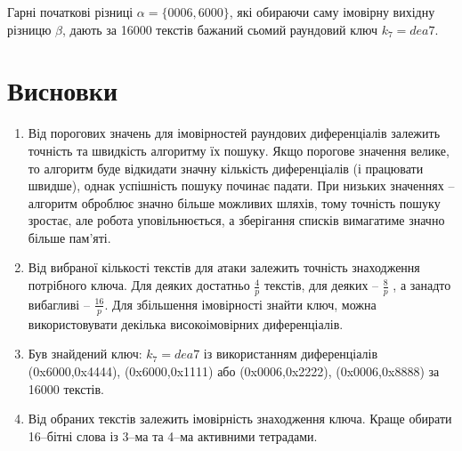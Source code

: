 \documentclass[12pt,a4paper]{article}
\begin{document}
Гарні початкові різниці $\alpha = \{0006,6000\}$, які обираючи саму імовірну вихідну різницю $\beta$, дають за 16000 текстів бажаний сьомий раундовий ключ $k_7 = dea7$. 


\section{Висновки}

\begin{enumerate}

\item Від порогових значень для імовірностей раундових диференціалів залежить точність та швидкість алгоритму їх пошуку. Якщо порогове значення велике, то алгоритм буде відкидати значну кількість диференціалів (і працювати швидше), однак успішність пошуку починає падати. При низьких значеннях -- алгоритм оброблює значно більше можливих шляхів, тому точність пошуку зростає, але робота уповільнюється, а зберігання списків вимагатиме значно більше пам’яті.

\item Від вибраної кількості текстів для атаки залежить точність знаходження потрібного ключа. Для деяких достатньо $\frac{4}{p}$ текстів, для деяких -- $\frac{8}{p}$  , а занадто вибагливі -- $\frac{16}{p}$. Для збільшення імовірності знайти ключ, можна використовувати декілька високоімовірних диференціалів.

\item Був знайдений ключ: $k_7 = dea7$ із використанням диференціалів (0x6000,0x4444), (0x6000,0x1111) або (0x0006,0x2222), (0x0006,0x8888) за 16000 текстів.

\item Від обраних текстів залежить імовірність знаходження ключа. Краще обирати 16--бітні слова із 3--ма та 4--ма активними тетрадами.


\end{enumerate}
\end{document}
